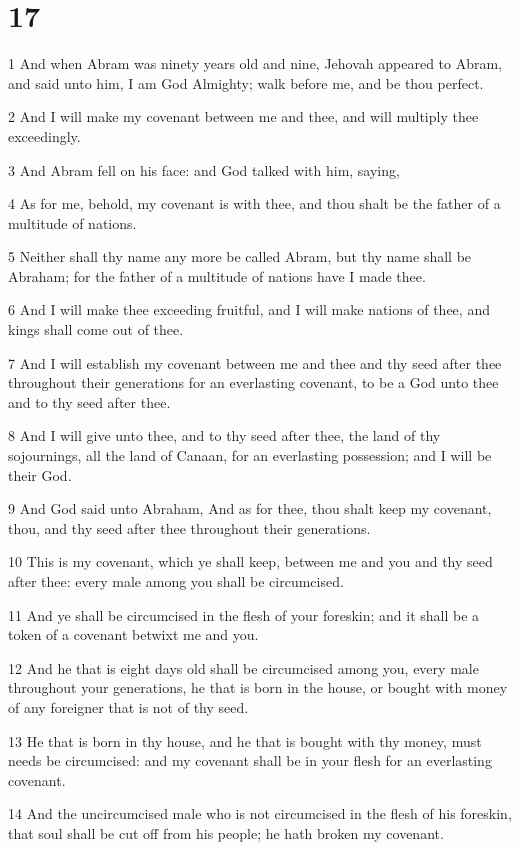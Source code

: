 \chapter{17}

\par 1 And when Abram was ninety years old and nine, Jehovah appeared to Abram, and said unto him, I am God Almighty; walk before me, and be thou perfect.
\par 2 And I will make my covenant between me and thee, and will multiply thee exceedingly.
\par 3 And Abram fell on his face: and God talked with him, saying,
\par 4 As for me, behold, my covenant is with thee, and thou shalt be the father of a multitude of nations.
\par 5 Neither shall thy name any more be called Abram, but thy name shall be Abraham; for the father of a multitude of nations have I made thee.
\par 6 And I will make thee exceeding fruitful, and I will make nations of thee, and kings shall come out of thee.
\par 7 And I will establish my covenant between me and thee and thy seed after thee throughout their generations for an everlasting covenant, to be a God unto thee and to thy seed after thee.
\par 8 And I will give unto thee, and to thy seed after thee, the land of thy sojournings, all the land of Canaan, for an everlasting possession; and I will be their God.
\par 9 And God said unto Abraham, And as for thee, thou shalt keep my covenant, thou, and thy seed after thee throughout their generations.
\par 10 This is my covenant, which ye shall keep, between me and you and thy seed after thee: every male among you shall be circumcised.
\par 11 And ye shall be circumcised in the flesh of your foreskin; and it shall be a token of a covenant betwixt me and you.
\par 12 And he that is eight days old shall be circumcised among you, every male throughout your generations, he that is born in the house, or bought with money of any foreigner that is not of thy seed.
\par 13 He that is born in thy house, and he that is bought with thy money, must needs be circumcised: and my covenant shall be in your flesh for an everlasting covenant.
\par 14 And the uncircumcised male who is not circumcised in the flesh of his foreskin, that soul shall be cut off from his people; he hath broken my covenant.

